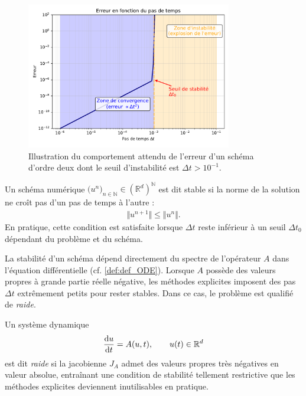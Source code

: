 \begin{figure}[htbp]
    \centering
    \includegraphics[width=0.8\textwidth]{media/3_/2_/exemple_satabilite.pdf}
    \caption{Illustration du comportement attendu de l'erreur d'un schéma d'ordre deux dont le seuil d'instabilité est $\Delta t > 10^{-1}$.}
    \label{fig:stabilite_schema}
\end{figure}

\begin{definition}
Un schéma numérique $\bigl(u^n\bigr)_{n\in\mathbb{N}} \in (\mathbb{R}^d)^{\mathbb{N}}$ est dit stable si la norme de la solution ne croît pas d’un pas de temps à l’autre :
\begin{align}
    \Vert u^{n+1} \Vert \leq \Vert u^n \Vert.
\end{align}
En pratique, cette condition est satisfaite lorsque $\Delta t$ reste inférieur à un seuil $\Delta t_0$ dépendant du problème et du schéma.
\end{definition}

La stabilité d’un schéma dépend directement du spectre de l’opérateur $A$ dans l’équation différentielle (cf. \eqref{def:def_ODE}).  
Lorsque $A$ possède des valeurs propres à grande partie réelle négative, les méthodes explicites imposent des pas $\Delta t$ extrêmement petits pour rester stables.  
Dans ce cas, le problème est qualifié de \emph{raide}.

\begin{definition}
Un système dynamique
\begin{align}
    \frac{\text d u}{\text d t} = A(u,t), \qquad u(t)\in\mathbb{R}^d
\end{align}
est dit \emph{raide} si la jacobienne $J_A$ admet des valeurs propres très négatives en valeur absolue, entraînant une condition de stabilité tellement restrictive que les méthodes explicites deviennent inutilisables en pratique.
\end{definition}

